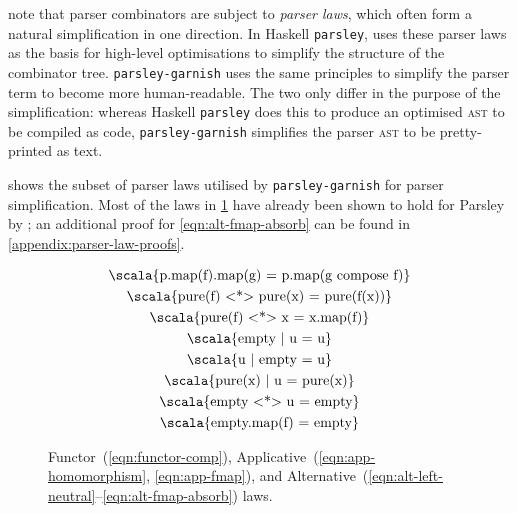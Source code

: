 \documentclass[../../../main.tex]{subfiles}
\begin{document}
\textcite{willis_staged_2023} note that parser combinators are subject to \emph{parser laws}, which often form a natural simplification in one direction.
In Haskell \texttt{parsley}, \textcite{willis_parsley_2023} uses these parser laws as the basis for high-level optimisations to simplify the structure of the combinator tree.
\texttt{parsley-garnish} uses the same principles to simplify the parser term to become more human-readable.
The two only differ in the purpose of the simplification: whereas Haskell \texttt{parsley} does this to produce an optimised \textsc{ast} to be compiled as code, \texttt{parsley-garnish} simplifies the parser \textsc{ast} to be pretty-printed as text.

 shows the subset of parser laws utilised by \texttt{parsley-garnish} for parser simplification.
Most of the laws in \cref{fig:parser-laws} have already been shown to hold for Parsley by \textcite{willis_garnishing_2018}; an additional proof for \cref{eqn:alt-fmap-absorb} can be found in \cref{appendix:parser-law-proofs}.

\begin{figure}[htbp]
\centering
\begin{gather}
  \text{\scala{p.map(f).map(g) = p.map(g compose f)}} \label{eqn:functor-comp} \\
  \text{\scala{pure(f) <*> pure(x) = pure(f(x))}} \label{eqn:app-homomorphism} \\
  \text{\scala{pure(f) <*> x = x.map(f)}} \label{eqn:app-fmap} \\
  \text{\scala{empty | u = u}} \label{eqn:alt-left-neutral} \\
  \text{\scala{u | empty = u}} \label{eqn:alt-right-neutral} \\
  \text{\scala{pure(x) | u = pure(x)}} \label{eqn:alt-left-biased-choice} \\
  \text{\scala{empty <*> u = empty}} \label{eqn:alt-empty-absorb} \\
  \text{\scala{empty.map(f) = empty}} \label{eqn:alt-fmap-absorb}
\end{gather}
\caption{Functor~(\ref{eqn:functor-comp}), Applicative~(\ref{eqn:app-homomorphism}, \ref{eqn:app-fmap}), and Alternative~(\ref{eqn:alt-left-neutral}--\ref{eqn:alt-fmap-absorb}) laws.}
\label{fig:parser-laws}
\end{figure}
\end{document}
